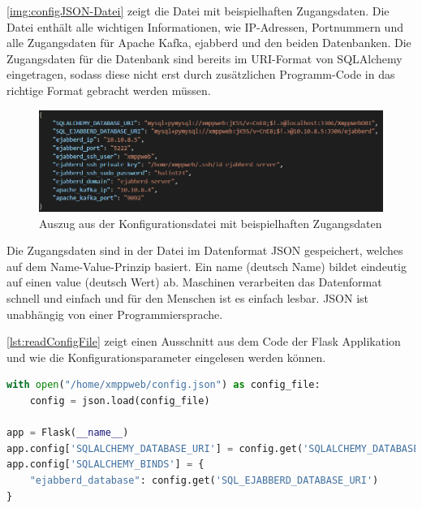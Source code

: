 \documentclass[a4paper,titlepage,halfparskip,12pt]{scrreprt}
\begin{document}
\begin{onehalfspacing}
\pagebreak

\autoref{img:configJSON-Datei} zeigt die Datei mit beispielhaften Zugangsdaten. Die Datei enthält alle wichtigen Informationen, wie IP-Adressen, Portnummern und alle Zugangsdaten für Apache Kafka, ejabberd und den beiden Datenbanken. Die Zugangsdaten für die Datenbank sind bereits im \acs{URI}-Format von SQLAlchemy eingetragen, sodass diese nicht erst durch zusätzlichen Programm-Code in das richtige Format gebracht werden müssen.

\begin{figure}[h]
	\centering
	\includegraphics[width=\linewidth]{images/configJSON-Datei}
	\caption{Auszug aus der Konfigurationsdatei mit beispielhaften Zugangsdaten}
	\label{img:configJSON-Datei}
\end{figure}

Die Zugangsdaten sind in der Datei im Datenformat \ac{JSON} gespeichert, welches auf dem Name-Value-Prinzip basiert. Ein name (deutsch Name) bildet eindeutig auf einen value (deutsch Wert) ab. Maschinen verarbeiten das Datenformat schnell und einfach und für den Menschen ist es einfach lesbar. \ac{JSON} ist unabhängig von einer Programmiersprache.\cite{jsonIntroduction}

\autoref{lst:readConfigFile} zeigt einen Ausschnitt aus dem Code der Flask Applikation und wie die Konfigurationsparameter eingelesen werden können.

\bigskip

\begin{lstlisting}[language=python, caption={Auslesen der Konfigurationsparameter aus einer Datei}, label={lst:readConfigFile}]
with open("/home/xmppweb/config.json") as config_file:
    config = json.load(config_file)

app = Flask(__name__)
app.config['SQLALCHEMY_DATABASE_URI'] = config.get('SQLALCHEMY_DATABASE_URI')
app.config['SQLALCHEMY_BINDS'] = {
    "ejabberd_database": config.get('SQL_EJABBERD_DATABASE_URI')
}
\end{lstlisting}


\end{onehalfspacing}
\end{document}
